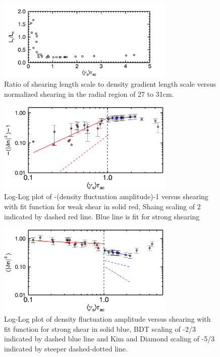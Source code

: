 \documentclass[aip,pop,amsmath,amssymb,reprint,superscriptaddress]{revtex4-1} %
\begin{document}
\begin{figure}[!htbp]
\centerline{
\includegraphics[width=8.5cm]{LgammaLn}}
\caption{\label{fig:LgammaLn} Ratio of shearing length scale to density gradient length scale versus normalized shearing in the radial region of 27 to 31cm.}
\end{figure}

\begin{figure}[!htbp]
\centerline{
\includegraphics[width=8.5cm]{densloglog_weak}}
\caption{\label{fig:densloglog_weak} Log-Log plot of -(density fluctuation amplitude)-1 versus shearing with fit function for weak shear in solid red, Shaing scaling of 2 indicated by dashed red line. Blue line is fit for strong shearing}
\end{figure}

\begin{figure}[!htbp]
\centerline{
\includegraphics[width=8.5cm]{densloglog_strong}}
\caption{\label{fig:densloglog_strong} Log-Log plot of density fluctuation amplitude versus shearing with fit function for strong shear in solid blue, BDT scaling of -2/3 indicated by dashed blue line and Kim and Diamond scaling of -5/3 indicated by steeper dashed-dotted line.}
\end{figure}
\end{document}
